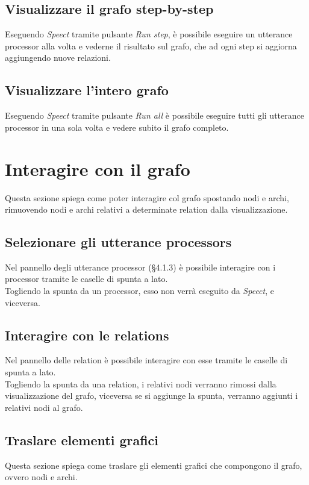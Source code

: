 \documentclass[openany,12pt,a4paper]{report}
\begin{document}
	\subsection{Visualizzare il grafo step-by-step}
	Eseguendo \textit{Speect} tramite pulsante \textit{Run step}, è possibile eseguire un utterance processor alla volta e vederne il risultato sul grafo, che ad ogni step si aggiorna aggiungendo nuove relazioni.
	
	\subsection{Visualizzare l'intero grafo}
	Eseguendo \textit{Speect} tramite pulsante \textit{Run all} è possibile eseguire tutti gli utterance processor in una sola volta e vedere subito il grafo completo.
	
	\section{Interagire con il grafo}
	Questa sezione spiega come poter interagire col grafo spostando nodi e archi, rimuovendo nodi e archi relativi a determinate relation dalla visualizzazione.
	
	\subsection{Selezionare gli utterance processors}
	Nel pannello degli utterance processor (§4.1.3) è possibile interagire con i processor tramite le caselle di spunta a lato.\\
	Togliendo la spunta da un processor, esso non verrà eseguito da \textit{Speect}, e viceversa.
	
	\subsection{Interagire con le relations}
	Nel pannello delle relation è possibile interagire con esse tramite le caselle di spunta a lato.\\
	Togliendo la spunta da una relation, i relativi nodi verranno rimossi dalla visualizzazione del grafo, viceversa se si aggiunge la spunta, verranno aggiunti i relativi nodi al grafo.
	
	\subsection{Traslare elementi grafici}
	Questa sezione spiega come traslare gli elementi grafici che compongono il grafo, ovvero nodi e archi.
	
\end{document}

